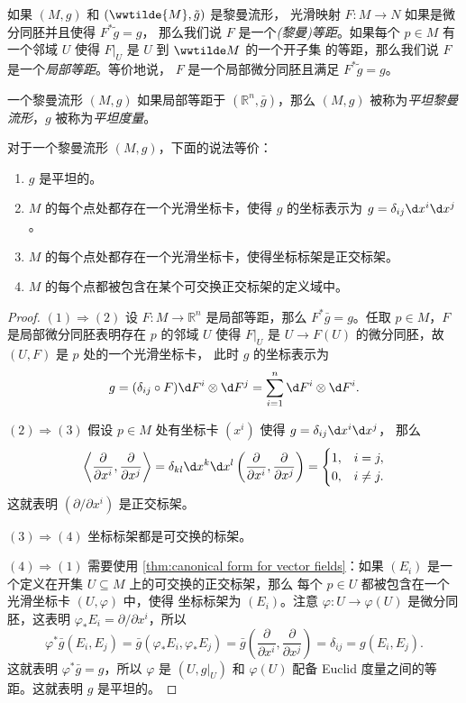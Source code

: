 如果 $(M,g)$ 和 $(\wwtilde{M},\tilde g)$ 是黎曼流形，
光滑映射 $F:M\to N$ 如果是微分同胚并且使得 $F^*\tilde g=g$，
那么我们说 $F$ 是一个\emph{(黎曼)等距}。如果每个 $p\in M$
有一个邻域 $U$ 使得 $F|_U$ 是 $U$ 到 $\wwtilde M$ 的一个开子集
的等距，那么我们说 $F$ 是一个\emph{局部等距}。等价地说，
$F$ 是一个局部微分同胚且满足 $F^*\tilde{g}=g$。

一个黎曼流形 $(M,g)$ 如果局部等距于 $(\mathbb{R}^n,\bar g)$，那么
$(M,g)$ 被称为\emph{平坦黎曼流形}，$g$ 被称为\emph{平坦度量}。

\begin{theorem}\label{thm:flat metric}
  对于一个黎曼流形 $(M,g)$，下面的说法等价：
  \begin{enumerate}
    \item $g$ 是平坦的。
    \item $M$ 的每个点处都存在一个光滑坐标卡，使得 $g$ 的坐标表示为
    $g=\delta_{ij}\d x^i\d x^j$。
    \item $M$ 的每个点处都存在一个光滑坐标卡，使得坐标标架是正交标架。
    \item $M$ 的每个点都被包含在某个可交换正交标架的定义域中。
  \end{enumerate}
\end{theorem}
\begin{proof}
  $(1)\Rightarrow (2)$ 设 $F:M\to \mathbb{R}^n$ 是局部等距，那么
  $F^*\bar g=g$。任取 $p\in M$，$F$ 是局部微分同胚表明存在 $p$ 的邻域 $U$ 使得 $F|_U$
  是 $U\to F(U)$ 的微分同胚，故 $(U,F)$ 是 $p$ 处的一个光滑坐标卡，
  此时 $g$ 的坐标表示为
  \[
    g=(\delta_{ij}\circ F) \d F^i\otimes \d F^j=\sum_{i=1}^n
    \d F^i\otimes \d F^i.
  \]

  $(2)\Rightarrow (3)$ 假设 $p\in M$ 处有坐标卡 $(x^i)$ 使得 $g=\delta_{ij}\d x^i\d x^j$，
  那么
  \[
    \inn{\frac{\partial}{\partial x^i},\frac{\partial}{\partial x^j}}
    =\delta_{kl}\d x^k\d x^l\left(
      \frac{\partial}{\partial x^i},\frac{\partial}{\partial x^j}
    \right)
    =\begin{cases}
      1, & i=j,\\
      0, & i\neq j.
    \end{cases}
  \]
  这就表明 $(\partial/\partial x^i)$ 是正交标架。

  $(3)\Rightarrow (4)$ 坐标标架都是可交换的标架。

  $(4)\Rightarrow (1)$ 需要使用 \autoref{thm:canonical form for vector fields}：如果
  $(E_i)$ 是一个定义在开集 $U\subseteq M$ 上的可交换的正交标架，那么
  每个 $p\in U$ 都被包含在一个光滑坐标卡 $(U,\varphi)$ 中，使得
  坐标标架为 $(E_i)$。注意 
  $\varphi:U\to\varphi(U)$ 是微分同胚，这表明 $\varphi_*E_i=\partial/\partial x^i$，所以
  \[
    \varphi^*\bar g(E_i,E_j)=\bar g(\varphi_*E_i,\varphi_*E_j)
    =\bar g\left(
      \frac{\partial}{\partial x^i},\frac{\partial}{\partial x^j}
    \right)=\delta_{ij}=g(E_i,E_j).
  \]
  这就表明 $\varphi^*\bar g=g$，所以 $\varphi$ 是 $(U,g|_U)$ 和 
  $\varphi(U)$ 配备 Euclid 度量之间的等距。这就表明 $g$ 是平坦的。
\end{proof}

